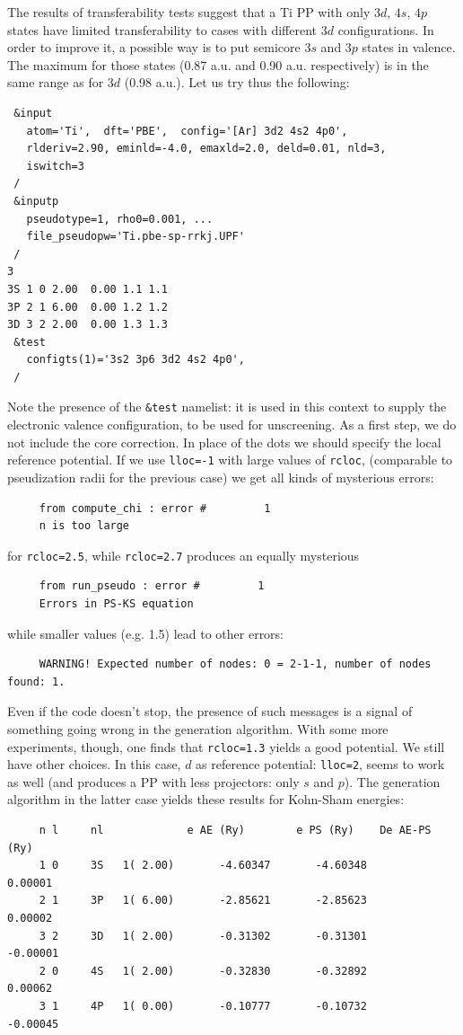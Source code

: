 \documentclass[12pt,a4paper]{article}
\begin{document}
The results of transferability tests suggest that a Ti PP with only
$3d$, $4s$, $4p$ states have limited transferability to cases with 
different $3d$ configurations. In order to improve it, a possible
way is to put semicore $3s$ and $3p$ states in valence. The maximum
for those states (0.87 a.u. and 0.90 a.u. respectively) is in the 
same range as for $3d$ (0.98 a.u.). Let us try thus the following:
\begin{verbatim}
 &input
   atom='Ti',  dft='PBE',  config='[Ar] 3d2 4s2 4p0',
   rlderiv=2.90, eminld=-4.0, emaxld=2.0, deld=0.01, nld=3,
   iswitch=3
 /
 &inputp
   pseudotype=1, rho0=0.001, ...
   file_pseudopw='Ti.pbe-sp-rrkj.UPF'
 /
3
3S 1 0 2.00  0.00 1.1 1.1
3P 2 1 6.00  0.00 1.2 1.2
3D 3 2 2.00  0.00 1.3 1.3
 &test
   configts(1)='3s2 3p6 3d2 4s2 4p0',
 /
\end{verbatim}
Note the presence of the \texttt{\&test} namelist: it is used in this
context to supply the electronic valence configuration, to be used
for unscreening. As a first step, we do not include the core correction.
In place of the dots we should specify the local reference potential. 
If we use \texttt{lloc=-1} with large values of \texttt{rcloc},
(comparable to pseudization radii for the previous case) 
we get all kinds of mysterious errors:
\begin{verbatim}
     from compute_chi : error #         1
     n is too large
\end{verbatim}
for \texttt{rcloc=2.5}, while \texttt{rcloc=2.7} produces an equally 
mysterious
\begin{verbatim}
     from run_pseudo : error #         1
     Errors in PS-KS equation
\end{verbatim}
while smaller values (e.g. 1.5) lead to other errors:
\begin{verbatim}
     WARNING! Expected number of nodes: 0 = 2-1-1, number of nodes found: 1.
\end{verbatim}
Even if the code doesn't stop, the presence of such messages
is a signal of something going wrong in the generation algorithm.
With some more experiments, though, one finds that \texttt{rcloc=1.3} 
yields a good potential. We still have other choices. In this case, 
$d$ as reference potential: \texttt{lloc=2}, seems to work as well
(and produces a PP with less projectors: only $s$ and $p$). 
The generation algorithm in the latter case yields these 
results for Kohn-Sham energies:
\begin{verbatim}
     n l     nl             e AE (Ry)        e PS (Ry)    De AE-PS (Ry) 
     1 0     3S   1( 2.00)       -4.60347       -4.60348        0.00001
     2 1     3P   1( 6.00)       -2.85621       -2.85623        0.00002
     3 2     3D   1( 2.00)       -0.31302       -0.31301       -0.00001
     2 0     4S   1( 2.00)       -0.32830       -0.32892        0.00062
     3 1     4P   1( 0.00)       -0.10777       -0.10732       -0.00045
\end{verbatim}
\end{document}
